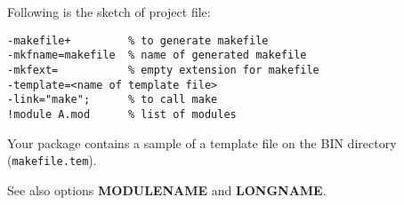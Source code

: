 Following is the sketch of project file:
\begin{verbatim}
-makefile+         % to generate makefile
-mkfname=makefile  % name of generated makefile
-mkfext=           % empty extension for makefile
-template=<name of template file>
-link="make";      % to call make
!module A.mod      % list of modules
\end{verbatim}

Your package contains a sample of a template file
on the BIN directory ({\tt makefile.tem}).

See also options {\bf MODULENAME} and {\bf LONGNAME}.

